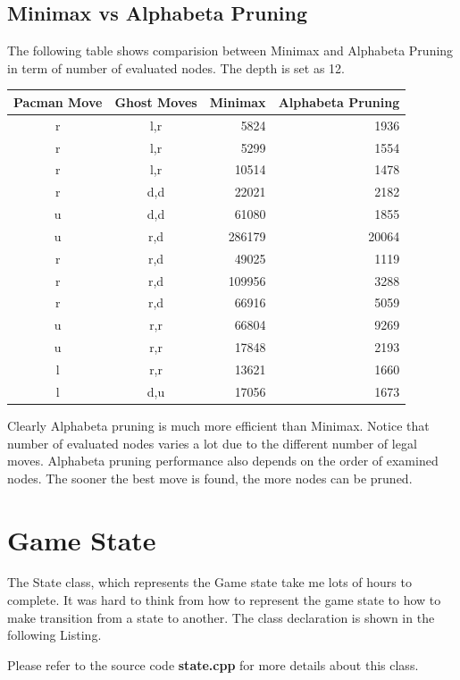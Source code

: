 \documentclass[a4paper, 11pt]{article}
\begin{document}
\subsection{Minimax vs Alphabeta Pruning}
The following table shows comparision between Minimax and Alphabeta Pruning in term of number of evaluated nodes. The depth is set as 12.
\begin{table}[ht]
  \centering
  \begin{tabular}{|c|c|r|r|}
    \hline
    Pacman Move & Ghost Moves & Minimax & Alphabeta Pruning \\ \hline
    r           & l,r         & 5824    & 1936              \\ \hline
    r           & l,r         & 5299    & 1554              \\ \hline
    r           & l,r         & 10514   & 1478              \\ \hline
    r           & d,d         & 22021   & 2182              \\ \hline
    u           & d,d         & 61080   & 1855              \\ \hline
    u           & r,d         & 286179  & 20064             \\ \hline
    r           & r,d         & 49025   & 1119              \\ \hline
    r           & r,d         & 109956  & 3288              \\ \hline
    r           & r,d         & 66916   & 5059              \\ \hline
    u           & r,r         & 66804   & 9269              \\ \hline 
    u           & r,r         & 17848   & 2193              \\ \hline
    l           & r,r         & 13621   & 1660              \\ \hline
    l           & d,u         & 17056   & 1673              \\ 
    \hline
  \end{tabular}
\end{table}
Clearly Alphabeta pruning is much more efficient than Minimax. Notice that number of evaluated nodes varies a lot due to the different number of legal moves. Alphabeta pruning performance also depends on the order of examined nodes. The sooner the best move is found, the more nodes can be pruned. 

\section{Game State}
The State class, which represents the Game state take me lots of hours to complete. It was hard to think from how to represent the game state to how to make transition from a state to another. The class declaration is shown in the following Listing.

Please refer to the source code \textbf{state.cpp} for more details about this class. 
\end{document}
